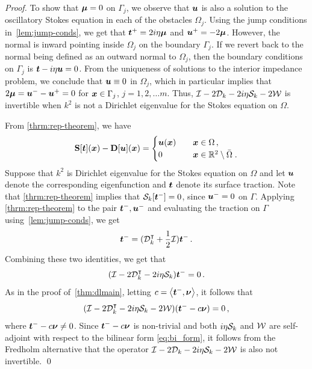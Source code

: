 \begin{proof}
To show that ${\boldsymbol \mu}=0$ on
$\Gamma_{j}$, we observe that ${\boldsymbol u}$ is also a
solution to the oscillatory Stokes equation in each
of the obstacles $\Omega_{j}$.
Using the jump conditions in~\cref{lem:jump-conds},
we get that ${\boldsymbol t}^{+} = 2i\eta {\boldsymbol \mu}$ and ${\boldsymbol u}^{+} = -2{\boldsymbol \mu}$.
However, the normal is inward pointing inside $\Omega_{j}$
on the boundary $\Gamma_{j}$. 
If we revert back to the normal being defined as 
an outward normal to $\Omega_{j}$, then
the boundary conditions on $\Gamma_{j}$ 
is ${\boldsymbol t} - i \eta {\boldsymbol u} = 0$. 
From the uniqueness of solutions to the interior 
impedance problem, we conclude that ${\boldsymbol u} \equiv 0$
in $\Omega_{j}$, which in particular implies
that $2{\boldsymbol \mu} = {\boldsymbol u}^{-}-{\boldsymbol u}^{+} = 0$ for ${\boldsymbol x} \in \Gamma_{j}$,
$j=1,2,\ldots m$.
Thus, $\mathcal I - 2{\mathcal D}_{k} -2i\eta{\mathcal S}_{k} -2{\mathcal W}$ is
invertible when $k^2$ is not a Dirichlet eigenvalue
for the Stokes equation on $\Omega$.

From \cref{thrm:rep-theorem}, we have 
\begin{equation} 
  {\bf S} [{\boldsymbol t}]({\boldsymbol x}) - {\bf D}[{\boldsymbol u}]({\boldsymbol x}) = \begin{cases} 
    {\boldsymbol u}({\boldsymbol x}) &\quad {\boldsymbol x} \in \Omega \, , \\
    0 &\quad {\boldsymbol x} \in \mathbb{R}^2 \setminus \bar{\Omega} \; .
    \end{cases}
  \end{equation}
Suppose that $k^2$ is Dirichlet eigenvalue for
the Stokes equation on $\Omega$ and let ${\boldsymbol u}$
denote the corresponding eigenfunction and ${\boldsymbol t}$ denote
its surface traction. Note that \cref{thrm:rep-theorem}
implies that ${\mathcal S}_{k}[{\boldsymbol t}^{-}] = 0$, since
${\boldsymbol u}^{-}=0$ on $\Gamma$. Applying \cref{thrm:rep-theorem}
to the pair ${\boldsymbol t}^{-}, {\boldsymbol u}^{-}$ and evaluating the
traction on $\Gamma$ using~\cref{lem:jump-conds},
we get
\begin{equation}
{\boldsymbol t}^{-} = ({\mathcal D}^{\intercal}_{k} + \frac{1}{2} \mathcal I) {\boldsymbol t}^{-} \, . 
\end{equation}
Combining these two identities, we get
that
\begin{equation}
(\mathcal I - 2{\mathcal D}_{k}^{\intercal} -2i\eta {\mathcal S}_{k}) {\boldsymbol t}^{-} = 0 \, .
\end{equation}
As in the proof of~\cref{thm:dlmain}, letting
$c = \left< {\boldsymbol t}^{-} ,{\boldsymbol \nu} \right>$, it follows that
\begin{equation}
  (\mathcal I - 2{\mathcal D}_{k}^{\intercal} - 2i \eta {\mathcal S}_{k} - 2{\mathcal W})
  ({\boldsymbol t}^{-} - c{\boldsymbol \nu}) = 0 \, ,
\end{equation}
where ${\boldsymbol t}^{-} - c{\boldsymbol \nu} \neq 0$.
Since ${\boldsymbol t}^{-} - c{\boldsymbol \nu}$ is non-trivial and both
$i\eta {\mathcal S}_{k}$ and ${\mathcal W}$ are self-adjoint with respect
to the bilinear form \cref{eq:bi_form},
it follows from the Fredholm alternative
that the operator $\mathcal I - 2{\mathcal D}_{k} -2i\eta {\mathcal S}_k - 2{\mathcal W}$
is also not invertible.
\qed
\end{proof}

